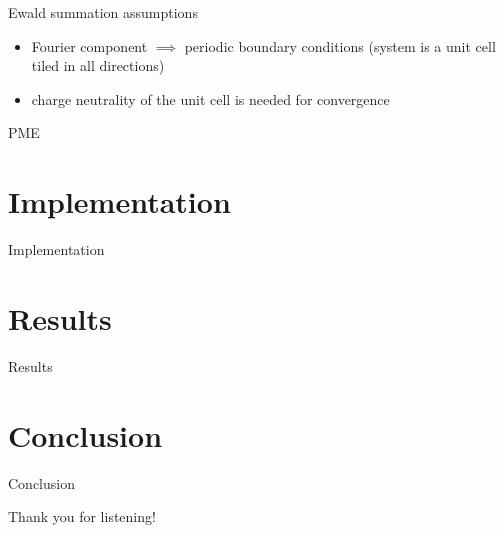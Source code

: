 \documentclass[11pt]{beamer}
\begin{document}
\begin{frame}{Ewald summation assumptions}
\begin{itemize}
\item Fourier component $\implies$ periodic boundary conditions (system is a unit cell tiled in all directions)
\item charge neutrality of the unit cell is needed for convergence
\end{itemize}
\end{frame}

\begin{frame}{PME}
\end{frame}

\section{Implementation}
\begin{frame}{Implementation}
\end{frame}

\section{Results}
\begin{frame}{Results}
\end{frame}

\section{Conclusion}
\begin{frame}{Conclusion}
\end{frame}

\begin{frame}[plain]
      Thank you for listening!
\end{frame}












\iffalse
\texttt{[image: electrical.png]} 
\[\dot{y}_L(t) = f_L(y_L, y_A, t); \;\;y_L(t_0)=y_{L,0}\]
\[\dot{y}_A(t) = f_A(y_L, y_A, t); \;\;y_A(t_0)=y_{A,0}\]

\begin{itemize}
\item the current implementation of the MPRK method is not suitable for our neuron model due to low performance
\item the method was developed for modeling latent electrical circuits, so the assumption by the method's authors is a very small number of active components (not in our case - 22 out of 40)
\item likely both our systems are stiff, so dynamic reassigning of latent/active roles based on error estimations would be interesting to study - not supported by the framework
\item parallelization of active steps during latent step possible - better run on dozens/hundreds of cores to matter
\fi
\end{document}
